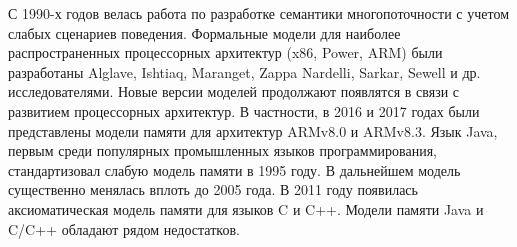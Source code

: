 

{\progress}
С 1990-х годов велась работа по
разработке семантики многопоточности с учетом слабых сценариев поведения.
Формальные модели для наиболее распространенных процессорных архитектур (x86, Power, ARM)
были разработаны Alglave, Ishtiaq, Maranget, Zappa Nardelli, Sarkar, Sewell и др. исследователями.
Новые версии моделей продолжают появлятся в связи с развитием процессорных архитектур.
В частности, в 2016 и 2017 годах были представлены модели памяти для архитектур ARMv8.0 и ARMv8.3.
Язык Java, первым среди популярных промышленных языков программирования,
стандартизовал слабую модель памяти в 1995 году. В дальнейшем модель существенно менялась вплоть до 2005 года.
В 2011 году появилась аксиоматическая модель памяти для языков C и C++.
Модели памяти Java и C/C++ обладают рядом недостатков.

